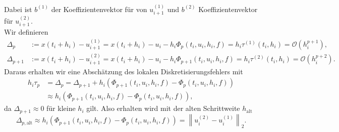 Dabei ist $b^{(1)}$ der Koeffizientenvektor für von $u_{i+1}^{(1)}$ und $b^{(2)}$ Koeffizientenvektor für
$u_{i+1}^{(2)}$.\\
Wir definieren
\begin{align*}
    \Delta_{p} &:= x(t_i + h_i) - u^{(1)}_{i+1}
    = x(t_i + h_i) - u_i - h_i \Phi_{p}(t_i,u_i,h_i,f)= h_i\tau^{(1)}(t_i,h_i) = \mathcal{O}(h_i^{p+1}),\\
    \Delta_{p+1} &:= x(t_i + h_i) - u^{(2)}_{i+1}
    = x(t_i + h_i) - u_i - h_i \Phi_{p+1}(t_i,u_i,h_i,f)= h_i\tau^{(2)}(t_i,h_i)= \mathcal{O}(h_i^{p+2}).
\end{align*}
Daraus erhalten wir eine Abschätzung des lokalen Diskretisierungsfehlers mit
\begin{align*}
    h_i\tau_{p} &= \Delta_{p} = \Delta_{p+1} + h_i(\Phi_{p+1}(t_i,u_i,h_i,f) - \Phi_{p}(t_i,u_i,h_i,f)) \\
    &\approx h_i(\Phi_{p+1}(t_i,u_i,h_i,f) - \Phi_{p}(t_i,u_i,h_i,f)),
\end{align*}
da $\Delta_{p+1} \approx 0$ für kleine $h_i$ gilt. Also erhalten wird mit der alten Schrittweite $h_{\text{alt}}$
\[
    \Delta_{p, \text{alt}} \approx h_i(\Phi_{p+1}(t_i,u_i,h_i,f) - \Phi_{p}(t_i,u_i,h_i,f))
    = \left\lVert u_i^{(2)} - u_i^{(1)} \right\rVert_2.
\]

